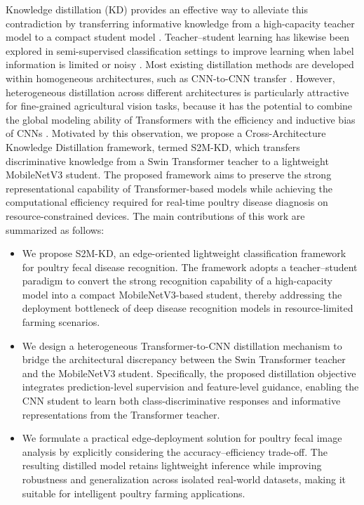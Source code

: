 \documentclass[review]{elsarticle}
\begin{document}
Knowledge distillation (KD) provides an effective way to alleviate this contradiction by transferring informative knowledge from a high-capacity teacher model to a compact student model \cite{hinton2015distilling,gou2021knowledge}.
Teacher--student learning has likewise been explored in semi-supervised classification settings to improve learning when label information is limited or noisy \cite{fan2024meanteacher}.
Most existing distillation methods are developed within homogeneous architectures, such as CNN-to-CNN transfer \cite{romero2014fitnets}.
However, heterogeneous distillation across different architectures is particularly attractive for fine-grained agricultural vision tasks, because it has the potential to combine the global modeling ability of Transformers with the efficiency and inductive bias of CNNs \cite{park2019relational,yim2017gift}.
Motivated by this observation, we propose a Cross-Architecture Knowledge Distillation framework, termed S2M-KD, which transfers discriminative knowledge from a Swin Transformer teacher \cite{liu2021swin} to a lightweight MobileNetV3 student.
The proposed framework aims to preserve the strong representational capability of Transformer-based models while achieving the computational efficiency required for real-time poultry disease diagnosis on resource-constrained devices.
The main contributions of this work are summarized as follows:
\begin{itemize}
    \item We propose S2M-KD, an edge-oriented lightweight classification framework for poultry fecal disease recognition. The framework adopts a teacher--student paradigm to convert the strong recognition capability of a high-capacity model into a compact MobileNetV3-based student, thereby addressing the deployment bottleneck of deep disease recognition models in resource-limited farming scenarios.

    \item We design a heterogeneous Transformer-to-CNN distillation mechanism to bridge the architectural discrepancy between the Swin Transformer teacher and the MobileNetV3 student. Specifically, the proposed distillation objective integrates prediction-level supervision and feature-level guidance, enabling the CNN student to learn both class-discriminative responses and informative representations from the Transformer teacher.

    \item We formulate a practical edge-deployment solution for poultry fecal image analysis by explicitly considering the accuracy--efficiency trade-off. The resulting distilled model retains lightweight inference while improving robustness and generalization across isolated real-world datasets, making it suitable for intelligent poultry farming applications.
\end{itemize}
\end{document}

